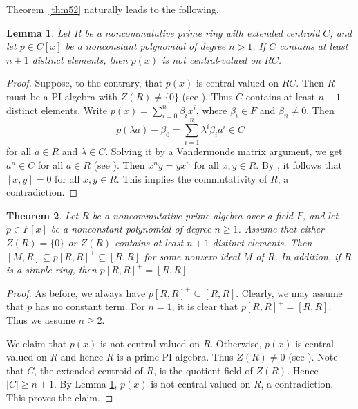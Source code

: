 \documentclass[11pt]{article}
\newtheorem{theorem}{Theorem}
\newtheorem{lemma}[theorem]{Lemma}
\theoremstyle{definition}
\begin{document}
{{{{				Theorem~\ref{thm52} naturally leads to the following.
				
				\begin{lemma}\label{lem71}
				Let $R$ be a noncommutative prime ring with extended centroid $C$, and let $p \in C[x]$ be a nonconstant polynomial of degree $n>1$. If $C$ contains at least $n+1$ distinct elements, then $p(x)$  is not central-valued on $RC$.
				\end{lemma}
				
				\begin{proof}
Suppose, to the contrary, that $p(x)$  is central-valued on $RC$. Then $R$ must be a PI-algebra with $Z(R)\ne \{0\}$ (see  \cite[Theorem 2]{rowen1973}).
Thus $C$ contains at least $n+1$ distinct elements. Write $\displaystyle p(x)=\sum_{i=0}^n\beta_ix^i$, where $\beta_i\in F$ and $\beta_n\ne 0$.
					Then
					$$
					p(\lambda a) - \beta_0 =\sum_{i=1}^n\lambda^i\beta_ia^i\in C
					$$
					for all $a\in R$ and $\lambda\in C$.  Solving it by a Vandermonde matrix argument, we get $a^n\in C$ for all $a\in R$ (see \cite[Lemma 2.2]{bresar2009}). Then $x^ny=yx^n$ for all $x, y\in R$. By \cite[Theorem, p.19]{lee1996},  it follows that $[x, y]=0$ for all $x, y\in R$.
This implies the commutativity of $R$, a contradiction.
				\end{proof}
				
				\begin{theorem}\label{thm73}
					Let $R$ be a noncommutative prime algebra over a field $F$, and let $p \in F[x]$ be a nonconstant polynomial of degree $n\geq 1$.
					Assume that  either $Z(R)=\{0\}$ or $Z(R)$ contains at least $n+1$ distinct elements.
					Then
					$[M, R]\subseteq p[R,R]^+\subseteq [R, R]$ for some nonzero ideal $M$ of $R$. In addition, if $R$ is a simple ring, then
					$p[R,R]^+=[R, R]$.
				\end{theorem}
				
				\begin{proof}
 As before, we always have $p[R,R]^+\subseteq [R, R]$.
					Clearly, we may assume that $p$ has no constant term.
					For $n=1$, it is clear that $p[R,R]^+=[R, R]$. Thus we assume $n\geq 2$.

					We claim that $p(x)$  is not central-valued on $R$. Otherwise, $p(x)$  is central-valued on $R$ and hence $R$ is a prime PI-algebra.
Thus $Z(R)\ne 0$ (see \cite[Theorem 2 and Corollary 1]{rowen1973}). Note that $C$, the extended centroid of $R$, is the quotient field of $Z(R)$. Hence $|C|\geq n+1$.
By Lemma \ref{lem71}, $p(x)$  is not central-valued on $R$, a contradiction. This proves the claim.


\end{proof}}}}}
\end{document}
